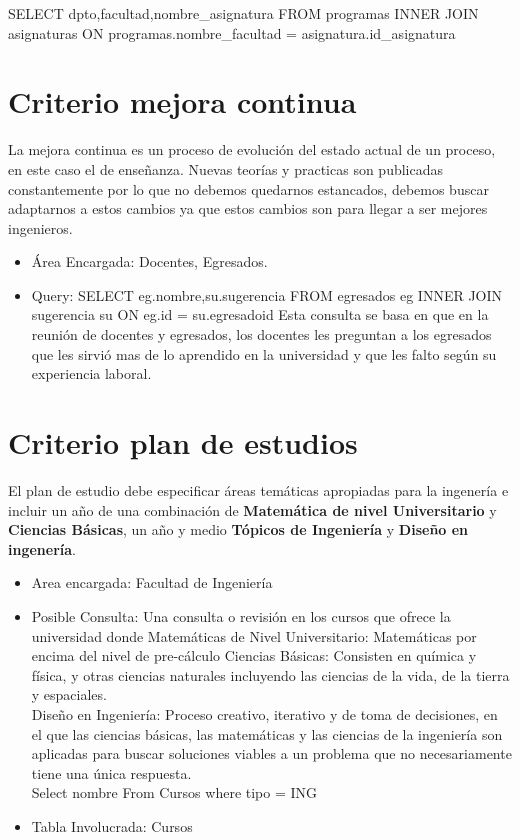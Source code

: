 \documentclass[12pt,a4paper]{report}
\begin{document}
SELECT dpto,facultad,nombre\_asignatura FROM programas
INNER JOIN asignaturas ON programas.nombre\_facultad = asignatura.id\_asignatura


\section{ Criterio mejora continua}
La mejora continua es un proceso de evolución del estado actual de un proceso, en este caso el de enseñanza. Nuevas teorías y practicas son publicadas constantemente por lo que no debemos quedarnos estancados, debemos buscar adaptarnos a estos cambios ya que estos cambios son para llegar a ser mejores ingenieros.
\begin{itemize}
\item Área Encargada: Docentes, Egresados.
\item Query: SELECT eg.nombre,su.sugerencia FROM egresados eg INNER JOIN sugerencia su ON eg.id = su.egresadoid
Esta consulta se basa en que en la reunión de docentes y egresados, los docentes les preguntan a los egresados que les sirvió mas de lo aprendido en la universidad y que les falto según su experiencia laboral.
\end{itemize}
\section{ Criterio plan de estudios}
El plan de estudio debe especificar áreas temáticas apropiadas para la ingenería e incluir un año de una combinación de \textbf{Matemática de nivel Universitario} y \textbf{Ciencias Básicas}, un año y medio \textbf{Tópicos de Ingeniería} y \textbf{Diseño en ingenería}.

\begin{itemize}
\item Area encargada: Facultad de Ingeniería

\item Posible Consulta: Una consulta o revisión en los cursos que ofrece la universidad donde Matemáticas de Nivel Universitario: Matemáticas por encima del nivel de pre-cálculo
Ciencias Básicas: Consisten en química y física, y otras ciencias naturales incluyendo las ciencias de la vida, de la tierra y espaciales.\\
Diseño en Ingeniería: Proceso creativo, iterativo y de toma de decisiones, en el que las ciencias básicas, las matemáticas y las ciencias de la ingeniería son aplicadas para buscar soluciones viables a un problema que no necesariamente tiene una única respuesta.\\
Select nombre From Cursos where tipo = ING

\item Tabla Involucrada: Cursos
\end{itemize}
\end{document}
